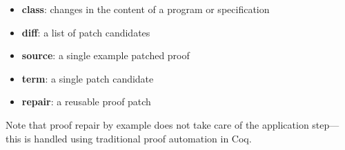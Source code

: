 \begin{itemize}
\item \textbf{class}: changes in the content of a program or specification 
\item \textbf{diff}: a list of patch candidates
\item \textbf{source}: a single example patched proof
\item \textbf{term}: a single patch candidate
\item \textbf{repair}: a reusable proof patch
\end{itemize}
Note that proof repair by example does not take care of the application step---this is handled using traditional proof automation in Coq.
\fi

\iffalse
\paragraph{Proof Repair Across Type Equivalences}
Chapter~\ref{chapt:pi} describes semantic differencing algorithms and proof term transformations for proof repair in response
to changes that can be described by a type equivalence. %
The corresponding differencing algorithms run in response to a breaking change in the structure of a datatype.
They look at the difference between the old and new versions of that datatype.
When they succeed, the diff that they find is a \textit{type equivalence}: a pair of functions that map back and forth between the
two versions of the datatype (possibly with some additional information) and are mutual inverses.
The corresponding proof term transformation then transforms a proof term defined over the old version of the dataype
directly to a proof term defined over the new version of the datatype.
In summary, proof repair across type equivalence has this profile:

\begin{itemize}
\item \textbf{class}: changes in the structure of a datatype
\item \textbf{diff}: a type equivalence
\item \textbf{source}: the changed datatype
\item \textbf{term}: a proof term defined over the old version of the datatype
\item \textbf{repair}: a proof term defined over the new version of the datatype
\end{itemize}
\fi


